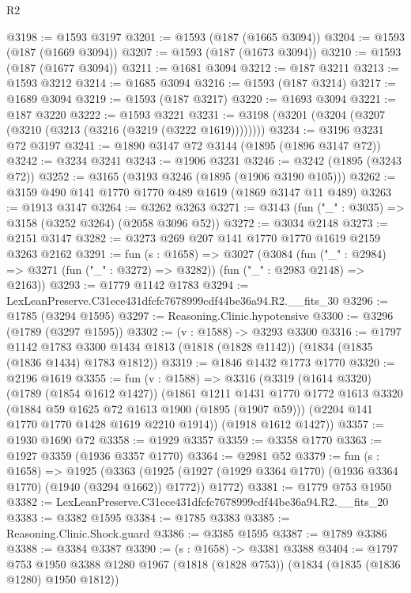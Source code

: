 \begin{lexlean}{R2}
\begin{coremodule}
@3198 := @1593 @3197
@3201 := @1593 (@187 (@1665 @3094))
@3204 := @1593 (@187 (@1669 @3094))
@3207 := @1593 (@187 (@1673 @3094))
@3210 := @1593 (@187 (@1677 @3094))
@3211 := @1681 @3094
@3212 := @187 @3211
@3213 := @1593 @3212
@3214 := @1685 @3094
@3216 := @1593 (@187 @3214)
@3217 := @1689 @3094
@3219 := @1593 (@187 @3217)
@3220 := @1693 @3094
@3221 := @187 @3220
@3222 := @1593 @3221
@3231 := @3198 (@3201 (@3204 (@3207 (@3210 (@3213 (@3216 (@3219 (@3222 @1619))))))))
@3234 := @3196 @3231 @72 @3197
@3241 := @1890 @3147 @72 @3144 (@1895 (@1896 @3147 @72))
@3242 := @3234 @3241
@3243 := @1906 @3231
@3246 := @3242 (@1895 (@3243 @72))
@3252 := @3165 (@3193 @3246 (@1895 (@1906 @3190 @105)))
@3262 := @3159 @490 @141 @1770 @1770 @489 @1619 (@1869 @3147 @11 @489)
@3263 := @1913 @3147
@3264 := @3262 @3263
@3271 := @3143 (fun ("_" : @3035) => @3158 (@3252 @3264) (@2058 @3096 @52))
@3272 := @3034 @2148
@3273 := @2151 @3147
@3282 := @3273 @269 @207 @141 @1770 @1770 @1619 @2159 @3263 @2162
@3291 := fun (s : @1658) =>
  @3027
    (@3084
      (fun ("_" : @2984) => @3271 (fun ("_" : @3272) => @3282))
      (fun ("_" : @2983 @2148) => @2163))
@3293 := @1779 @1142 @1783
@3294 := LexLeanPreserve.C31ece431dfcfc7678999cdf44be36a94.R2.__fits_30
@3296 := @1785 (@3294 @1595)
@3297 := Reasoning.Clinic.hypotensive
@3300 := @3296 (@1789 (@3297 @1595))
@3302 := (v : @1588) -> @3293 @3300
@3316 := @1797
    @1142
    @1783
    @3300
    @1434
    @1813
    (@1818 (@1828 @1142))
    (@1834 (@1835 (@1836 @1434) @1783 @1812))
@3319 := @1846 @1432 @1773 @1770
@3320 := @2196 @1619
@3355 := fun (v : @1588) =>
  @3316
    (@3319
      (@1614 @3320)
      (@1789 (@1854 @1612 @1427))
      (@1861
        @1211
        @1431
        @1770
        @1772
        @1613
        @3320
        (@1884 @59 @1625 @72 @1613 @1900 (@1895 (@1907 @59)))
        (@2204 @141 @1770 @1770 @1428 @1619 @2210 @1914))
      (@1918 @1612 @1427))
@3357 := @1930 @1690 @72
@3358 := @1929 @3357
@3359 := @3358 @1770
@3363 := @1927 @3359 (@1936 @3357 @1770)
@3364 := @2981 @52
@3379 := fun (s : @1658) =>
  @1925
    (@3363
      (@1925 (@1927 (@1929 @3364 @1770) (@1936 @3364 @1770) (@1940 (@3294 @1662)) @1772))
      @1772)
@3381 := @1779 @753 @1950
@3382 := LexLeanPreserve.C31ece431dfcfc7678999cdf44be36a94.R2.__fits_20
@3383 := @3382 @1595
@3384 := @1785 @3383
@3385 := Reasoning.Clinic.Shock.guard
@3386 := @3385 @1595
@3387 := @1789 @3386
@3388 := @3384 @3387
@3390 := (s : @1658) -> @3381 @3388
@3404 := @1797
    @753
    @1950
    @3388
    @1280
    @1967
    (@1818 (@1828 @753))
    (@1834 (@1835 (@1836 @1280) @1950 @1812))

\end{coremodule}
\end{lexlean}
